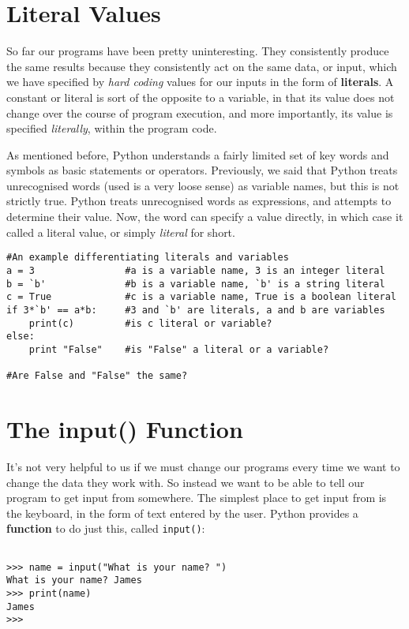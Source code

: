 
\section{Literal Values}

So far our programs have been pretty uninteresting. They     consistently produce the same results because they consistently act on     the same data, or input, which we have specified by \textit{hard       coding} values for our inputs in the form of     \textbf{literals}. A constant or literal is sort of the opposite to a     variable, in that its value does not change over the course of program     execution, and more importantly, its value is specified     \textit{literally}, within the program code.

As mentioned before, Python understands a fairly limited set of key     words and symbols as basic statements or operators. Previously, we     said that Python treats unrecognised words (used is a very loose sense)     as variable names, but this is not strictly true. Python treats     unrecognised words as expressions, and attempts to determine their     value. Now, the word can specify a value directly, in which case it     called a literal value, or simply \textit{literal} for short. 
\begin{lstlisting}
#An example differentiating literals and variables
a = 3                #a is a variable name, 3 is an integer literal
b = `b'              #b is a variable name, `b' is a string literal
c = True             #c is a variable name, True is a boolean literal
if 3*`b' == a*b:     #3 and `b' are literals, a and b are variables
    print(c)         #is c literal or variable?
else:                
    print "False"    #is "False" a literal or a variable?

#Are False and "False" the same?
\end{lstlisting}

\section{The input() Function}

It's not very helpful to us if we must change our programs every     time we want to change the data they work with. So instead we want to     be able to tell our program to get input from somewhere. The simplest     place to get input from is the keyboard, in the form of text entered by     the user. Python provides a \textbf{function} to do just this,     called \texttt{input()}:
\begin{lstlisting}

>>> name = input("What is your name? ")
What is your name? James
>>> print(name)
James
>>>
\end{lstlisting}

